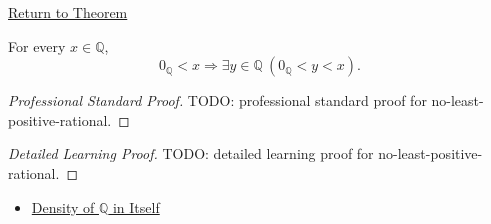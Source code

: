 \newpage
{}
\label{prf:no-least-positive-rational}

\begin{remark*}[Return]
\hyperref[prop:no-least-positive-rational]{Return to Theorem}
\end{remark*}

\begin{proposition*}
For every $x\in\mathbb{Q}$,
\[
0_{\mathbb{Q}}<x
\Longrightarrow
\exists y\in\mathbb{Q}\ (0_{\mathbb{Q}}<y<x).
\]
\end{proposition*}

\begin{proof}[Professional Standard Proof]
\LRAProofBodyStart
TODO: professional standard proof for no-least-positive-rational.
\end{proof}

\begin{proof}[Detailed Learning Proof]
\LRAProofBodyStart
TODO: detailed learning proof for no-least-positive-rational.
\end{proof}

\begin{remark*}
\end{remark*}

\begin{dependencies}
\begin{itemize}
  \item \hyperref[thm:density-of-q]{Density of $\mathbb{Q}$ in Itself}
\end{itemize}
\end{dependencies}

\clearpage
